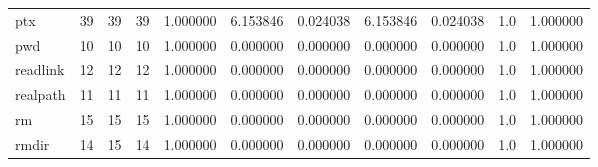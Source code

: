 \begin{longtable}{lrrrrrrrrrr}
ptx       &                                      39 &                 39 &                                39 &                                   1.000000 &                               6.153846 &                                     0.024038 &                          6.153846 &                                0.024038 &                                1.0 &                                           1.000000 \\
pwd       &                                      10 &                 10 &                                10 &                                   1.000000 &                               0.000000 &                                     0.000000 &                          0.000000 &                                0.000000 &                                1.0 &                                           1.000000 \\
readlink  &                                      12 &                 12 &                                12 &                                   1.000000 &                               0.000000 &                                     0.000000 &                          0.000000 &                                0.000000 &                                1.0 &                                           1.000000 \\
realpath  &                                      11 &                 11 &                                11 &                                   1.000000 &                               0.000000 &                                     0.000000 &                          0.000000 &                                0.000000 &                                1.0 &                                           1.000000 \\
rm        &                                      15 &                 15 &                                15 &                                   1.000000 &                               0.000000 &                                     0.000000 &                          0.000000 &                                0.000000 &                                1.0 &                                           1.000000 \\
rmdir     &                                      14 &                 15 &                                14 &                                   1.000000 &                               0.000000 &                                     0.000000 &                          0.000000 &                                0.000000 &                                1.0 &                                           1.000000 \\

\end{longtable}
